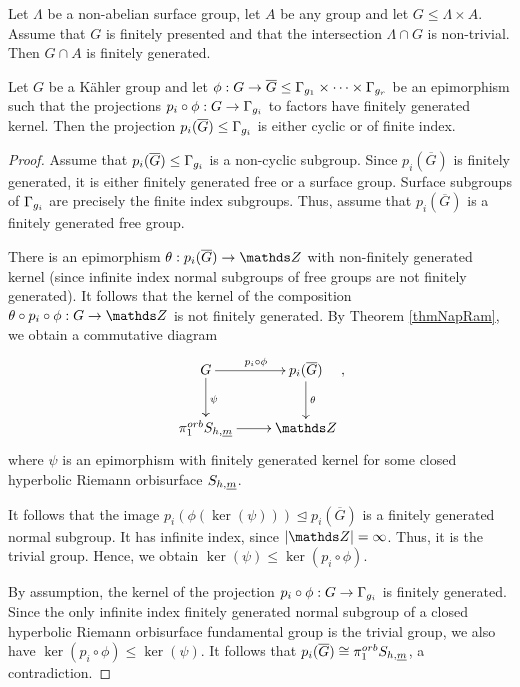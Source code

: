 \begin{theorem}
Let $\Lambda$ be a non-abelian  surface group, let $A$ be any group and let $G\leq \Lambda \times A$. Assume that $G$ is finitely presented and that the intersection $\Lambda \cap G$ is non-trivial. Then $G\cap A$ is finitely generated.
\label{thmBriMil}
\end{theorem}




\begin{lemma}
 Let $G$ be a K\"ahler group and let $\phi: G\rightarrow \overline{G}\leq \Gamma_{g_1}\times \dots \times \Gamma_{g_r}$ be an epimorphism such that the projections $p_i\circ \phi: G \rightarrow \Gamma_{g_i}$ to factors have finitely generated kernel. Then the projection $p_i(\overline{G})\leq \Gamma_{g_i}$ is either cyclic or of finite index.
 \label{lemSurCyc}
\end{lemma}

\begin{proof}
 Assume that $p_i(\overline{G})\leq \Gamma_{g_i}$ is a non-cyclic subgroup. Since $p_i(\overline{G})$ is finitely generated, it is either finitely generated free or a surface group. Surface subgroups of $\Gamma_{g_i}$ are precisely the finite index subgroups. Thus, assume that $p_i(\overline{G})$ is a finitely generated free group.
 
 There is an epimorphism $\theta: p_i(\overline{G})\rightarrow \ZZ$ with non-finitely generated kernel (since infinite index normal subgroups of free groups are not finitely generated). It follows that the kernel of the composition $\theta \circ p_i\circ \phi: G \rightarrow \ZZ$ is not finitely generated. By Theorem \ref{thmNapRam}, we obtain a commutative diagram
 \[
 \xymatrix{ G\ar[r]^{p_i\circ\phi}\ar[d]^{\psi} & p_i(\overline{G})\ar[d]^{\theta}\\
 			 \pi_1^{orb}S_{h,\mm}\ar[r]& \ZZ},
 \]
where $\psi$ is an epimorphism with finitely generated kernel for some closed hyperbolic Riemann orbisurface $S_{h,{\underline{m}}}$.

It follows that the image $p_i(\phi(\ker(\psi)))\unlhd p_i(\overline{G})$ is a finitely generated normal subgroup. It has infinite index, since $\left|\ZZ\right|=\infty$. Thus, it is the trivial group. Hence, we obtain $\ker(\psi)\leq \ker (p_i\circ \phi)$. 

By assumption, the kernel of the projection $p_i\circ \phi : G \rightarrow \Gamma_{g_i}$ is finitely generated. Since the only infinite index finitely generated normal subgroup of a closed hyperbolic Riemann orbisurface fundamental group is the trivial group, we also have $\ker (p_i\circ \phi) \leq \ker (\psi)$. It follows that $p_i(\overline{G})\cong \pi_1^{orb} S_{h,{\underline{m}}}$, a contradiction.
\end{proof}

